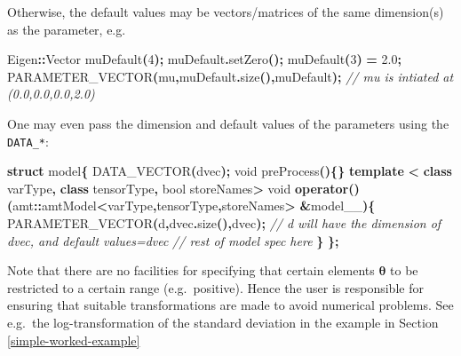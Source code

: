 \documentclass[
]{book}
\newenvironment{Shaded}{\begin{snugshade}}{\end{snugshade}}
\newcommand{\CommentTok}[1]{\textcolor[rgb]{0.56,0.35,0.01}{\textit{#1}}}
\newcommand{\DataTypeTok}[1]{\textcolor[rgb]{0.13,0.29,0.53}{#1}}
\newcommand{\DecValTok}[1]{\textcolor[rgb]{0.00,0.00,0.81}{#1}}
\newcommand{\FloatTok}[1]{\textcolor[rgb]{0.00,0.00,0.81}{#1}}
\newcommand{\KeywordTok}[1]{\textcolor[rgb]{0.13,0.29,0.53}{\textbf{#1}}}
\newcommand{\NormalTok}[1]{#1}
\newcommand{\OperatorTok}[1]{\textcolor[rgb]{0.81,0.36,0.00}{\textbf{#1}}}
\begin{document}
Otherwise, the default values may be vectors/matrices of the same dimension(s) as the parameter, e.g.

\begin{Shaded}
\begin{Highlighting}[]
\NormalTok{Eigen}\OperatorTok{::}\NormalTok{Vector muDefault}\OperatorTok{(}\DecValTok{4}\OperatorTok{);}
\NormalTok{muDefault}\OperatorTok{.}\NormalTok{setZero}\OperatorTok{();}
\NormalTok{muDefault}\OperatorTok{(}\DecValTok{3}\OperatorTok{)} \OperatorTok{=} \FloatTok{2.0}\OperatorTok{;}
\NormalTok{PARAMETER\_VECTOR}\OperatorTok{(}\NormalTok{mu}\OperatorTok{,}\NormalTok{muDefault}\OperatorTok{.}\NormalTok{size}\OperatorTok{(),}\NormalTok{muDefault}\OperatorTok{);}
\CommentTok{// mu is intiated at (0.0,0.0,0.0,2.0)}
\end{Highlighting}
\end{Shaded}

One may even pass the dimension and default values of the parameters using the \texttt{DATA\_*}:

\begin{Shaded}
\begin{Highlighting}[]
\KeywordTok{struct}\NormalTok{ model}\OperatorTok{\{}
\NormalTok{  DATA\_VECTOR}\OperatorTok{(}\NormalTok{dvec}\OperatorTok{);}
  \DataTypeTok{void}\NormalTok{ preProcess}\OperatorTok{()\{\}}
  \KeywordTok{template} \OperatorTok{\textless{}} \KeywordTok{class}\NormalTok{ varType}\OperatorTok{,} \KeywordTok{class}\NormalTok{ tensorType}\OperatorTok{,} \DataTypeTok{bool}\NormalTok{ storeNames}\OperatorTok{\textgreater{}}
  \DataTypeTok{void} \KeywordTok{operator}\OperatorTok{()(}\NormalTok{amt}\OperatorTok{::}\NormalTok{amtModel}\OperatorTok{\textless{}}\NormalTok{varType}\OperatorTok{,}\NormalTok{tensorType}\OperatorTok{,}\NormalTok{storeNames}\OperatorTok{\textgreater{}} \OperatorTok{\&}\NormalTok{model\_\_}\OperatorTok{)\{}
\NormalTok{    PARAMETER\_VECTOR}\OperatorTok{(}\NormalTok{d}\OperatorTok{,}\NormalTok{dvec}\OperatorTok{.}\NormalTok{size}\OperatorTok{(),}\NormalTok{dvec}\OperatorTok{);}
    \CommentTok{// d will have the dimension of dvec, and default values=dvec}
    \CommentTok{// rest of model spec here}
  \OperatorTok{\}}
\OperatorTok{\};}
\end{Highlighting}
\end{Shaded}

Note that there are no facilities for specifying that certain elements \(\boldsymbol \theta\) to be restricted to a certain range (e.g.~positive). Hence the user is responsible for ensuring that suitable transformations are made to avoid numerical problems. See e.g.~the log-transformation of the standard deviation in the example in Section \ref{simple-worked-example}
\end{document}
